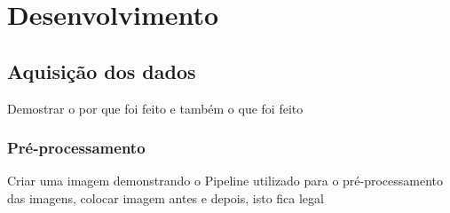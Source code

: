 \newpage
\chapter{Desenvolvimento}
\label{ch:desenvolvimento}


\section{Aquisição dos dados}

Demostrar o por que foi feito e também o que foi feito

\subsection{Pré-processamento} 


\par Criar uma imagem demonstrando o Pipeline utilizado para o pré-processamento das imagens, colocar imagem antes e depois, isto fica legal
